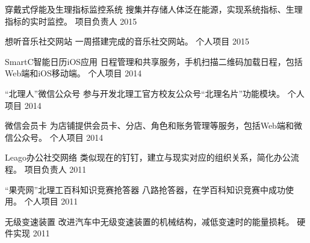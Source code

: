 \begin{cventries}
\begin{cvhonors}
\cvhonor
{穿戴式俘能及生理指标监控系统} %
{搜集并存储人体泛在能源，实现系统指标、生理指标的实时监控。} %
{项目负责人} %
{2015} %

\cvhonor
{想听音乐社交网站} %
{一周搭建完成的音乐社交网站。} %
{个人项目} %
{2015} %

\cvhonor
{SmartC智能日历iOS应用} %
{日程管理和共享服务，手机扫描二维码加载日程，包括Web端和iOS移动端。} %
{个人项目} %
{2014} %

\cvhonor
{“北理人”微信公众号} %
{参与开发北理工官方校友公众号“北理名片”功能模块。} %
{个人项目} %
{2014} %

\cvhonor
{微信会员卡} %
{为店铺提供会员卡、分店、角色和账务管理等服务，包括Web端和微信公众号。} %
{个人项目} %
{2014} %

\cvhonor
{Leago办公社交网络} %
{类似现在的钉钉，建立与现实对应的组织关系，简化办公流程。} %
{项目负责人} %
{2011} %

\cvhonor
{“果壳网”北理工百科知识竞赛抢答器} %
{八路抢答器，在学百科知识竞赛中成功使用。} %
{个人项目} %
{2011} %

\cvhonor
{无级变速装置} %
{改进汽车中无级变速装置的机械结构，减低变速时的能量损耗。} %
{硬件实现} %
{2011} %

\end{cvhonors}


\end{cventries}